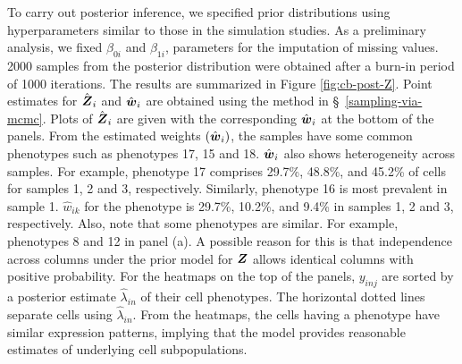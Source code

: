 \documentclass[12pt,]{article}
\newcommand{\bZ}{\mbox{\boldmath $Z$}}
\newcommand{\bw}{\mbox{\boldmath $w$}}
\begin{document}
To carry out posterior inference, we specified prior distributions using
hyperparameters similar to those in the simulation studies. As a preliminary
analysis, we fixed $\beta_{0i}$ and $\beta_{1i}$, parameters for the imputation
of missing values. 2000 samples from the posterior distribution were obtained
after a burn-in period of 1000 iterations. The results are summarized in Figure
\ref{fig:cb-post-Z}.  Point estimates for $\hat{\bZ}_i$ and $\hat{\bw}_i$ are
obtained using the method in \S~\ref{sampling-via-mcmc}.
Plots of $\hat{\bZ}_i$ are given with the corresponding $\hat{\bw}_i$ at the
bottom of the panels.  From the estimated weights $(\hat{\bw}_i)$, the samples
have some common phenotypes such as phenotypes 17, 15 and 18.
$\hat{\bw}_i$ also shows heterogeneity across samples.  For example, phenotype
17 comprises 29.7\%, 48.8\%, and 45.2\% of cells for samples 1, 2 and 3,
respectively.
%
Similarly, phenotype 16 is most prevalent in sample 1.  $\hat{w}_{ik}$ for the
phenotype is 29.7\%, 10.2\%, and 9.4\% in samples 1, 2 and 3, respectively.
%
Also, note that some phenotypes are similar. For example, phenotypes 8 and
12 in panel (a).  A possible reason for this is that independence across
columns under the prior model for $\bZ$ allows identical columns with positive
probability.  For the heatmaps on the top of the panels, $y_{inj}$ are sorted
by a posterior estimate $\hat{\lambda}_{in}$ of their cell phenotypes. The
horizontal dotted lines separate cells using $\hat{\lambda}_{in}$.  From the
heatmaps, the cells having a phenotype have similar expression patterns,
implying that the model provides reasonable estimates of underlying cell
subpopulations.
\end{document}
